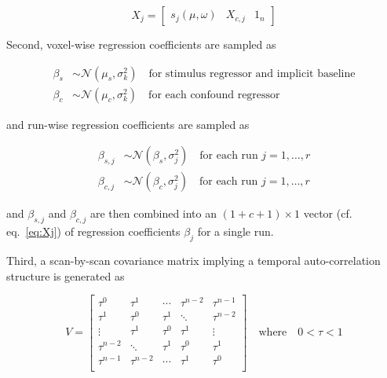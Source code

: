 \documentclass[a4paper,12pt]{article}
\begin{document}
\begin{equation} \label{eq:Xj}
X_j = \left[ \begin{matrix} s_j(\mu,\omega) & X_{c,j} & 1_n \end{matrix} \right]
\end{equation}

Second, voxel-wise regression coefficients are sampled as

\vspace{-0.5em}
\begin{equation} \label{eq:b}
\begin{split}
\beta_s &\sim \mathcal{N}(\mu_s, \sigma_k^2) \quad \text{for stimulus regressor and implicit baseline} \\
\beta_c &\sim \mathcal{N}(\mu_c, \sigma_k^2) \quad \text{for each confound regressor}
\end{split}
\end{equation}

and run-wise regression coefficients are sampled as

\vspace{-0.5em}
\begin{equation} \label{eq:bj}
\begin{split}
\beta_{s,j} &\sim \mathcal{N}(\beta_s, \sigma_j^2) \quad \text{for each run } j = 1,\ldots,r \\
\beta_{c,j} &\sim \mathcal{N}(\beta_c, \sigma_j^2) \quad \text{for each run } j = 1,\ldots,r
\end{split}
\end{equation}

and $\beta_{s,j}$ and $\beta_{c,j}$ are then combined into an $(1+c+1) \times 1$ vector (cf. eq.~\ref{eq:Xj}) of regression coefficients $\beta_j$ for a single run.

\pagebreak
Third, a scan-by-scan covariance matrix implying a temporal auto-correlation structure is generated as

\begin{equation} \label{eq:V}
V = \left[ \begin{matrix}
\tau^0 & \tau^1 & \cdots & \tau^{n-2} & \tau^{n-1} \\
\tau^1 & \tau^0 & \tau^1 & \ddots & \tau^{n-2} \\
\vdots & \tau^1 & \tau^0 & \tau^1 & \vdots \\
\tau^{n-2} & \ddots & \tau^1 & \tau^0 & \tau^1 \\
\tau^{n-1} & \tau^{n-2} & \cdots & \tau^1 & \tau^0 \\
\end{matrix} \right] \quad \text{where} \quad 0 < \tau < 1
\end{equation}
\end{document}
